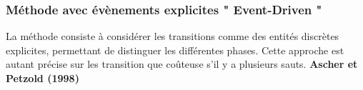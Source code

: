 \documentclass[12pt, oneside]{report} %
\theoremstyle{definition}
\theoremstyle{remark}
\begin{document}
\begin{itemize}
% 
		\end{itemize}
		
		
	\subsubsection{Méthode avec évènements explicites " Event-Driven "}
La méthode consiste à considérer les transitions comme des entités discrètes explicites, permettant de distinguer les différentes phases. Cette approche est autant précise sur les transition que coûteuse s'il y a plusieurs sauts. \textbf{Ascher et Petzold (1998)}
\end{document}
